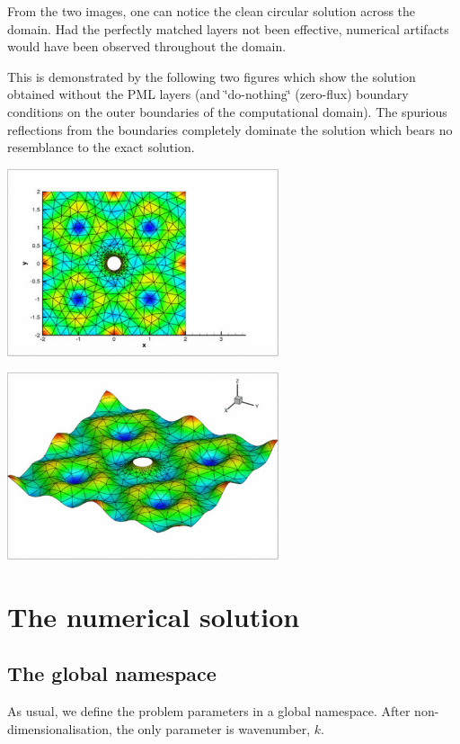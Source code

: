 From the two images, one can notice the clean circular solution across the domain. Had the perfectly matched layers not been effective, numerical artifacts would have been observed throughout the domain.

This is demonstrated by the following two figures which show the solution obtained without the P\+ML layers (and \char`\"{}do-\/nothing\char`\"{} (zero-\/flux) boundary conditions on the outer boundaries of the computational domain). The spurious reflections from the boundaries completely dominate the solution which bears no resemblance to the exact solution.

 
\begin{DoxyImage}
\includegraphics[width=0.6\textwidth]{ZeroFlux2D}
\end{DoxyImage}


 
\begin{DoxyImage}
\includegraphics[width=0.6\textwidth]{ZeroFluxHeight}
\end{DoxyImage}
\hypertarget{index_num_soln}{}\section{The numerical solution}\label{index_num_soln}
\hypertarget{index_namespace}{}\subsection{The global namespace}\label{index_namespace}
As usual, we define the problem parameters in a global namespace. After non-\/dimensionalisation, the only parameter is wavenumber, $ k $.

